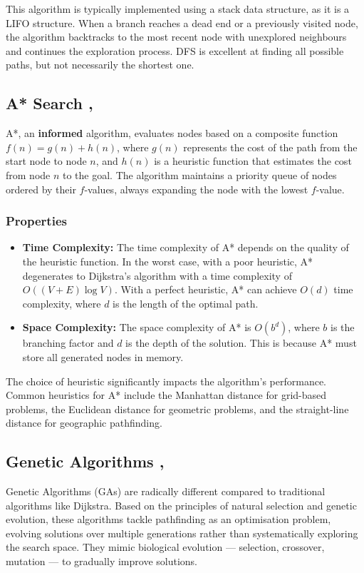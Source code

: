 This algorithm is typically implemented using a stack data structure, as it is a LIFO structure. When a branch reaches a dead end or a previously visited node, the algorithm backtracks to the most recent node with unexplored neighbours and continues the exploration process. DFS is excellent at finding all possible paths, but not necessarily the shortest one.

\subsection{A* Search \cite{patel_2019_introduction}, \cite{s_2021_a}}
A*, an \textbf{informed} algorithm, evaluates nodes based on a composite function $ f(n) = g(n) + h(n) $, where $ g(n) $ represents the cost of the path from the start node to node $ n $, and $ h(n) $ is a heuristic function that estimates the cost from node $ n $ to the goal. The algorithm maintains a priority queue of nodes ordered by their $ f $-values, always expanding the node with the lowest $ f $-value.

\subsubsection{Properties}
\begin{itemize}    
    \item \textbf{Time Complexity:} The time complexity of A* depends on the quality of the heuristic function. In the worst case, with a poor heuristic, A* degenerates to Dijkstra's algorithm with a time complexity of $ O((V + E) \log V) $. With a perfect heuristic, A* can achieve $ O(d) $ time complexity, where $ d $ is the length of the optimal path.
    
    \item \textbf{Space Complexity:} The space complexity of A* is $ O(b^d) $, where $ b $ is the branching factor and $ d $ is the depth of the solution. This is because A* must store all generated nodes in memory.
\end{itemize}

The choice of heuristic significantly impacts the algorithm's performance. Common heuristics for A* include the Manhattan distance for grid-based problems, the Euclidean distance for geometric problems, and the straight-line distance for geographic pathfinding.

\subsection{Genetic Algorithms \cite{geeksforgeeks_2017_genetic}, \cite{geeksforgeeks_2024_introduction}}
Genetic Algorithms (GAs) are radically different compared to traditional algorithms like Dijkstra. Based on the principles of natural selection and genetic evolution, these algorithms tackle pathfinding as an optimisation problem, evolving solutions over multiple generations rather than systematically exploring the search space. They mimic biological evolution — selection, crossover, mutation — to gradually improve solutions.

